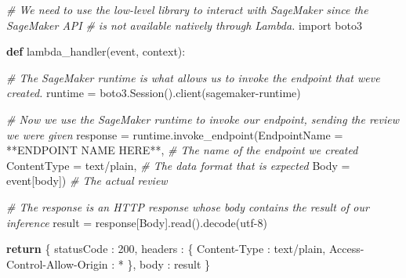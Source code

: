 \documentclass[11pt]{article}
\newenvironment{Shaded}{}{}
\newcommand{\KeywordTok}[1]{\textcolor[rgb]{0.00,0.44,0.13}{\textbf{{#1}}}}
\newcommand{\DecValTok}[1]{\textcolor[rgb]{0.25,0.63,0.44}{{#1}}}
\newcommand{\StringTok}[1]{\textcolor[rgb]{0.25,0.44,0.63}{{#1}}}
\newcommand{\CommentTok}[1]{\textcolor[rgb]{0.38,0.63,0.69}{\textit{{#1}}}}
\newcommand{\NormalTok}[1]{{#1}}
\newcommand{\ImportTok}[1]{{#1}}
\newcommand{\ControlFlowTok}[1]{\textcolor[rgb]{0.00,0.44,0.13}{\textbf{{#1}}}}
\newcommand{\OperatorTok}[1]{\textcolor[rgb]{0.40,0.40,0.40}{{#1}}}
\begin{document}
\begin{Shaded}
\begin{Highlighting}[]
\CommentTok{\# We need to use the low{-}level library to interact with SageMaker since the SageMaker API}
\CommentTok{\# is not available natively through Lambda.}
\ImportTok{import}\NormalTok{ boto3}

\KeywordTok{def}\NormalTok{ lambda\_handler(event, context):}

    \CommentTok{\# The SageMaker runtime is what allows us to invoke the endpoint that we\textquotesingle{}ve created.}
\NormalTok{    runtime }\OperatorTok{=}\NormalTok{ boto3.Session().client(}\StringTok{\textquotesingle{}sagemaker{-}runtime\textquotesingle{}}\NormalTok{)}

    \CommentTok{\# Now we use the SageMaker runtime to invoke our endpoint, sending the review we were given}
\NormalTok{    response }\OperatorTok{=}\NormalTok{ runtime.invoke\_endpoint(EndpointName }\OperatorTok{=} \StringTok{\textquotesingle{}**ENDPOINT NAME HERE**\textquotesingle{}}\NormalTok{,    }\CommentTok{\# The name of the endpoint we created}
\NormalTok{                                       ContentType }\OperatorTok{=} \StringTok{\textquotesingle{}text/plain\textquotesingle{}}\NormalTok{,                 }\CommentTok{\# The data format that is expected}
\NormalTok{                                       Body }\OperatorTok{=}\NormalTok{ event[}\StringTok{\textquotesingle{}body\textquotesingle{}}\NormalTok{])                       }\CommentTok{\# The actual review}

    \CommentTok{\# The response is an HTTP response whose body contains the result of our inference}
\NormalTok{    result }\OperatorTok{=}\NormalTok{ response[}\StringTok{\textquotesingle{}Body\textquotesingle{}}\NormalTok{].read().decode(}\StringTok{\textquotesingle{}utf{-}8\textquotesingle{}}\NormalTok{)}

    \ControlFlowTok{return}\NormalTok{ \{}
        \StringTok{\textquotesingle{}statusCode\textquotesingle{}}\NormalTok{ : }\DecValTok{200}\NormalTok{,}
        \StringTok{\textquotesingle{}headers\textquotesingle{}}\NormalTok{ : \{ }\StringTok{\textquotesingle{}Content{-}Type\textquotesingle{}}\NormalTok{ : }\StringTok{\textquotesingle{}text/plain\textquotesingle{}}\NormalTok{, }\StringTok{\textquotesingle{}Access{-}Control{-}Allow{-}Origin\textquotesingle{}}\NormalTok{ : }\StringTok{\textquotesingle{}*\textquotesingle{}}\NormalTok{ \},}
        \StringTok{\textquotesingle{}body\textquotesingle{}}\NormalTok{ : result}
\NormalTok{    \}}
\end{Highlighting}
\end{Shaded}
\end{document}
